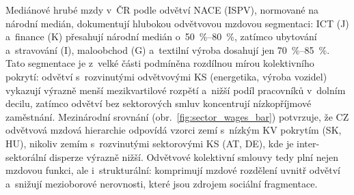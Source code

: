 Mediánové hrubé mzdy v~ČR podle odvětví \ac{NACE} (\ac{ISPV}), normované na národní medián, dokumentují hlubokou odvětvovou mzdovou segmentaci: ICT (J) a~finance (K) přesahují národní medián o~\SIrange{50}{80}{\percent}, zatímco ubytování a~stravování (I), maloobchod (G) a~textilní výroba dosahují jen \SIrange{70}{85}{\percent}.
Tato segmentace je z~velké části podmíněna rozdílnou mírou kolektivního pokrytí: odvětví s~rozvinutými odvětvovými \ac{KS} (energetika, výroba vozidel) vykazují výrazně menší mezikvartilové rozpětí a~nižší podíl pracovníků v~dolním decilu, zatímco odvětví bez sektorových smluv koncentrují nízkopříjmové zaměstnání.
Mezinárodní srovnání (obr.~\ref{fig:sector_wages_bar}) potvrzuje, že CZ odvětvová mzdová hierarchie odpovídá vzorci zemí s~nízkým \ac{KV} pokrytím (SK, HU), nikoliv zemím s~rozvinutými sektorovými \ac{KS} (AT, DE), kde je inter-sektorální disperze výrazně nižší.
Odvětvové kolektivní smlouvy tedy plní nejen mzdovou funkci, ale i~strukturální: komprimují mzdové rozdělení uvnitř odvětví a~snižují mezioborové nerovnosti, které jsou zdrojem sociální fragmentace.


